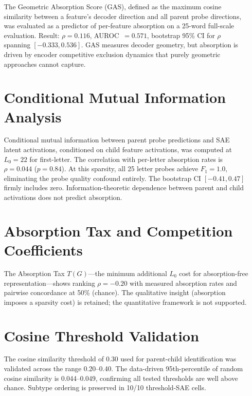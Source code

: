 \documentclass{article}
\begin{document}
The Geometric Absorption Score (GAS), defined as the maximum cosine similarity between a feature's decoder direction and all parent probe directions, was evaluated as a predictor of per-feature absorption on a 25-word full-scale evaluation. Result: $\rho = 0.116$, AUROC~$= 0.571$, bootstrap 95\% CI for $\rho$ spanning $[-0.333, 0.536]$. GAS measures decoder geometry, but absorption is driven by encoder competitive exclusion dynamics that purely geometric approaches cannot capture.

\section{Conditional Mutual Information Analysis}
\label{app:cmi}

Conditional mutual information between parent probe predictions and SAE latent activations, conditioned on child feature activations, was computed at $L_0 = 22$ for first-letter. The correlation with per-letter absorption rates is $\rho = 0.044$ ($p = 0.84$). At this sparsity, all 25 letter probes achieve $F_1 = 1.0$, eliminating the probe quality confound entirely. The bootstrap CI $[-0.41, 0.47]$ firmly includes zero. Information-theoretic dependence between parent and child activations does not predict absorption.

\section{Absorption Tax and Competition Coefficients}
\label{app:tax}

The Absorption Tax $T(G)$---the minimum additional $L_0$ cost for absorption-free representation---shows ranking $\rho = -0.20$ with measured absorption rates and pairwise concordance at 50\% (chance). The qualitative insight (absorption imposes a sparsity cost) is retained; the quantitative framework is not supported.

\section{Cosine Threshold Validation}
\label{app:cosine}

The cosine similarity threshold of 0.30 used for parent-child identification was validated across the range 0.20--0.40. The data-driven 95th-percentile of random cosine similarity is 0.044--0.049, confirming all tested thresholds are well above chance. Subtype ordering is preserved in 10/10 threshold-SAE cells.
\end{document}
